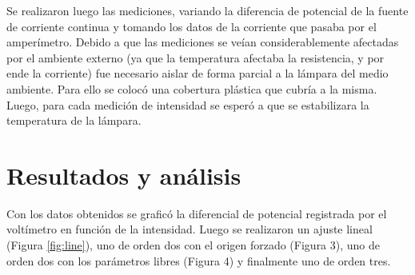 \documentclass[twoside,twocolumn,a4paper]{article}
\begin{document}
Se realizaron luego las mediciones, variando la diferencia de potencial de la fuente de corriente continua y tomando los datos de la corriente que pasaba por el amper\'imetro. Debido a que las mediciones se ve\'ian considerablemente afectadas por el ambiente externo (ya que la temperatura afectaba la resistencia, y por ende la corriente) fue necesario aislar de forma parcial a la l\'ampara del medio ambiente. Para ello se coloc\'o una cobertura pl\'astica que cubr\'ia a la misma. Luego, para cada medici\'on de intensidad se esper\'o a que se estabilizara la temperatura de la l\'ampara.

\section{Resultados y an\'alisis}

Con los datos obtenidos se grafic\'o la diferencial de potencial registrada por el volt\'imetro en funci\'on de la intensidad. Luego se realizaron un ajuste lineal (Figura \ref{fig:line}), uno de orden dos con el origen forzado (Figura 3), uno de orden dos con los par\'ametros libres (Figura 4) y finalmente uno de orden tres.\par
\end{document}
